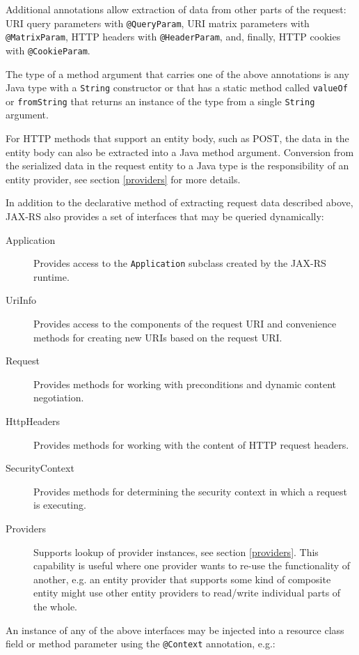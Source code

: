 \documentclass{acm_proc_article-sp}
\begin{document}
Additional annotations allow extraction of data from other parts of the request:
URI query parameters with \texttt{@Query\-Param}, URI matrix parameters with \texttt{@Matrix\-Param}, HTTP headers with \texttt{@Header\-Param}, and, finally, HTTP cookies with \texttt{@Cookie\-Param}.

The type of a method argument that carries one of the above annotations is any Java type with a \texttt{String} constructor or that has a static method called \texttt{valueOf} or \texttt{fromString} that returns an instance of the type from a single \texttt{String} argument.

For HTTP methods that support an entity body, such as POST, the data in the entity body can also be extracted into a Java method argument. Conversion from the serialized data in the request entity to a Java type is the responsibility of an entity provider, see section \ref{providers} for more details.

In addition to the declarative method of extracting request data described above, JAX-RS also provides a set of interfaces that may be queried dynamically:

\begin{description}
\item[Application] Provides access to the \texttt{Application} subclass created by the JAX-RS runtime.
\item[UriInfo] Provides access to the components of the request URI and convenience methods for creating new URIs based on the request URI.
\item[Request] Provides methods for working with preconditions and dynamic content negotiation.
\item[HttpHeaders] Provides methods for working with the content of HTTP request headers.
\item[SecurityContext] Provides methods for determining the security context in which a request is executing.
\item[Providers] Supports lookup of provider instances, see section \ref{providers}. This capability is useful where one provider wants to re-use the functionality of another, e.g. an entity provider that supports some kind of composite entity might use other entity providers to read/write individual parts of the whole.
\end{description}

An instance of any of the above interfaces may be injected into a resource class field or method parameter using the \texttt{@Context} annotation, e.g.:
\end{document}
